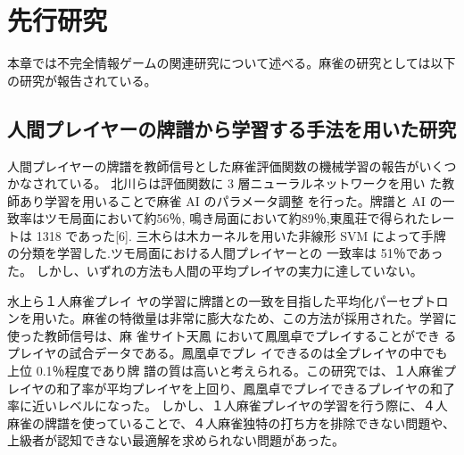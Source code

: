 \chapter{先行研究}
\label{chap:relevantstudy}

本章では不完全情報ゲームの関連研究について述べる。麻雀の研究としては以下の研究が報告されている。

\section{人間プレイヤーの牌譜から学習する手法を用いた研究}
人間プレイヤーの牌譜を教師信号とした麻雀評価関数の機械学習の報告がいくつかなされている。
北川らは評価関数に 3 層ニューラルネットワークを用い た教師あり学習を用いることで麻雀 AI のパラメータ調整 を行った。\cite{kitakawa}牌譜と AI の一致率はツモ局面において約56％, 鳴き局面において約89％,東風荘で得られたレートは 1318 であった[6].
三木らは木カーネルを用いた非線形 SVM によって手牌 の分類を学習した.ツモ局面における人間プレイヤーとの 一致率は 51％であった\cite{miki}。
しかし、いずれの方法も人間の平均プレイヤの実力に達していない。

水上ら\cite{bakuuti}１人麻雀プレイ ヤの学習に牌譜との一致を目指した平均化パーセプトロンを用いた。麻雀の特徴量は非常に膨大なため、この方法が採用された。学習に使った教師信号は、麻 雀サイト天鳳 \cite{tenhou} において鳳凰卓でプレイすることができ るプレイヤの試合データである。鳳凰卓でプレ イできるのは全プレイヤの中でも上位 0.1％程度であり牌
譜の質は高いと考えられる。この研究では、１人麻雀プレイヤの和了率が平均プレイヤを上回り、鳳凰卓でプレイできるプレイヤの和了率に近いレベルになった。
しかし、１人麻雀プレイヤの学習を行う際に、４人麻雀の牌譜を使っていることで、４人麻雀独特の打ち方を排除できない問題や、上級者が認知できない最適解を求められない問題があった。


